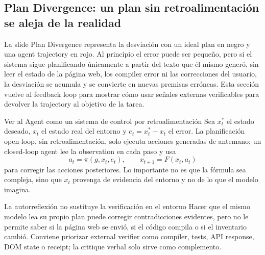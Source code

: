 
\subsection{Plan Divergence: un plan sin retroalimentación se aleja de la realidad}

La slide Plan Divergence representa la desviación con un ideal plan en negro y una agent trajectory en rojo. Al principio el error puede ser pequeño, pero si el sistema sigue planificando únicamente a partir del texto que él mismo generó, sin leer el estado de la página web, los compiler error ni las correcciones del usuario, la desviación se acumula y se convierte en nuevas premisas erróneas. Esta sección vuelve al feedback loop para mostrar cómo usar señales externas verificables para devolver la trajectory al objetivo de la tarea.


\begin{importantbox}{Ver al Agent como un sistema de control por retroalimentación}
Sea $x_t^*$ el estado deseado, $x_t$ el estado real del entorno y $e_t=x_t^*-x_t$ el error. La planificación open-loop, sin retroalimentación, solo ejecuta acciones generadas de antemano; un closed-loop agent lee la observation en cada paso y usa
\[
a_t=\pi(g,x_t,e_t),\qquad x_{t+1}=F(x_t,a_t)
\]
para corregir las acciones posteriores. Lo importante no es que la fórmula sea compleja, sino que $x_t$ provenga de evidencia del entorno y no de lo que el modelo imagina.
\end{importantbox}

\begin{warningbox}{La autorreflexión no sustituye la verificación en el entorno}
Hacer que el mismo modelo lea su propio plan puede corregir contradicciones evidentes, pero no le permite saber si la página web se envió, si el código compila o si el inventario cambió. Conviene priorizar external verifier como compiler, tests, API response, DOM state o receipt; la critique verbal solo sirve como complemento.
\end{warningbox}

